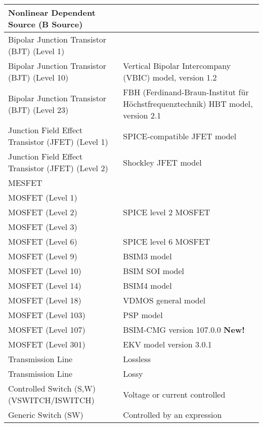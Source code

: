 \begin{longtable}[h] {>{\raggedright\small}m{2in}|>{\raggedright\let\\\tabularnewline\small}m{3.5in}}
    Nonlinear Dependent Source  (B Source) & \\ \hline

    Bipolar Junction Transistor (BJT) (Level 1)&  \\ \hline

    Bipolar Junction Transistor (BJT) (Level 10)& 
Vertical Bipolar Intercompany (VBIC) model, version 1.2 \\ \hline

    Bipolar Junction Transistor (BJT) (Level 23)& 
FBH (Ferdinand-Braun-Institut f\"ur H\"ochstfrequenztechnik) HBT model, version 2.1 \\ \hline

    Junction Field Effect Transistor (JFET) (Level 1)  &  
SPICE-compatible JFET model\\ \hline
    Junction Field Effect Transistor (JFET) (Level 2) &  
Shockley JFET model\\ \hline

    MESFET &  \\ \hline

    MOSFET (Level 1) &  \\ \hline
    MOSFET (Level 2) &  SPICE level 2 MOSFET \\ \hline
    MOSFET (Level 3) &  \\ \hline
    MOSFET (Level 6) &  SPICE level 6 MOSFET \\ \hline
    MOSFET (Level 9) &  BSIM3 model \\ \hline
    MOSFET (Level 10) & BSIM SOI model \\ \hline
    MOSFET (Level 14) & BSIM4 model \\ \hline
    MOSFET (Level 18) &  VDMOS general model \\ \hline
    MOSFET (Level 103) & PSP model \\ \hline
    MOSFET (Level 107)  & BSIM-CMG version 107.0.0 {\color{red}\textbf{New!}}\\ \hline
    MOSFET (Level 301)& EKV model version 3.0.1 \\ \hline

    Transmission Line &  Lossless \\ \hline
    Transmission Line &  Lossy  \\ \hline
    Controlled Switch (S,W) (VSWITCH/ISWITCH) & Voltage or current controlled\\ \hline

    Generic Switch (SW) & Controlled by an expression\\ \hline


\end{longtable}
